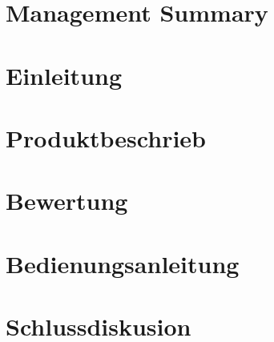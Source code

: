 \documentclass[11pt]{scrartcl}
\begin{document}
    

    \setcounter{tocdepth}{2}
    \tableofcontents
    \clearpage

    \section{Management Summary}
    
    \clearpage

    \section{Einleitung}
    
    \clearpage

    \section{Produktbeschrieb}
    
    
    
    \clearpage
    \begin{Huge} 
        \textbf{\color{red}{TODO: Weitere Kapitel}}
    \end{Huge}
    
    
    
    \clearpage

    \section{Bewertung}
    
    \clearpage

    \section{Bedienungsanleitung}
    
    \clearpage

    \section{Schlussdiskusion}
    
    \clearpage
\end{document}

